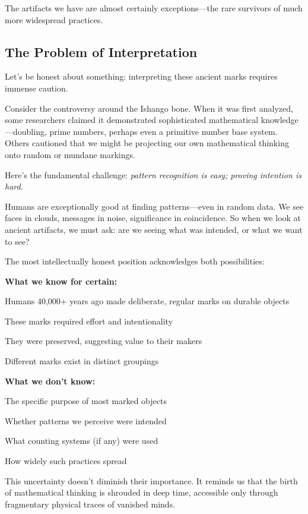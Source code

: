 The artifacts we have are almost certainly exceptions—the rare survivors of much more widespread practices.

\subsection{The Problem of Interpretation}

Let's be honest about something: interpreting these ancient marks requires immense caution.

Consider the controversy around the Ishango bone. When it was first analyzed, some researchers claimed it demonstrated sophisticated mathematical knowledge—doubling, prime numbers, perhaps even a primitive number base system. Others cautioned that we might be projecting our own mathematical thinking onto random or mundane markings.

Here's the fundamental challenge: \textit{pattern recognition is easy; proving intention is hard}.

Humans are exceptionally good at finding patterns—even in random data. We see faces in clouds, messages in noise, significance in coincidence. So when we look at ancient artifacts, we must ask: are we seeing what was intended, or what we want to see?

The most intellectually honest position acknowledges both possibilities:

\begin{important}
	\textbf{What we know for certain:}
	\begin{compactitem}
		\item Humans 40,000+ years ago made deliberate, regular marks on durable objects
		\item These marks required effort and intentionality
		\item They were preserved, suggesting value to their makers
		\item Different marks exist in distinct groupings
	\end{compactitem}
	
	\textbf{What we don't know:}
	\begin{compactitem}
		\item The specific purpose of most marked objects
		\item Whether patterns we perceive were intended
		\item What counting systems (if any) were used
		\item How widely such practices spread
	\end{compactitem}
	
	This uncertainty doesn't diminish their importance. It reminds us that the birth of mathematical thinking is shrouded in deep time, accessible only through fragmentary physical traces of vanished minds.
\end{important}

